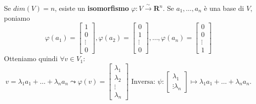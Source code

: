 \begin{definition}
	Se $dim(V)=n$, esiste un \textbf{isomorfismo} $\varphi: V \xrightarrow{\sim} \mathbf{R}^n$. Se $a_1, \hdots, a_n$ è una base di $V$, poniamo
	\begin{equation*}
		\varphi(a_1)=
		\begin{bmatrix}
			1 \\ 0 \\ \vdots \\ 0
		\end{bmatrix},
		\varphi(a_2)=
		\begin{bmatrix}
			0 \\ 1 \\ \vdots \\ 0
		\end{bmatrix},
		\hdots,
		\varphi(a_n)=
		\begin{bmatrix}
			0 \\ 0 \\ \vdots \\ 1
		\end{bmatrix}
	\end{equation*}
	Otteniamo quindi $\forall v \in V_1$:
	\begin{equation*}
		v = \lambda_{1}a_1 + \ldots + \lambda_n a_n \leadsto \varphi(v) = \begin{bmatrix}
			\lambda_{1} \\
			\lambda_{2} \\
			\vdots \\
			\lambda_{n}
		\end{bmatrix}
		\text{ Inversa: } \psi : 
		\begin{bmatrix}
			\lambda_{1} \\
			\vdots
			\lambda_{n}
		\end{bmatrix}
		\mapsto
		\lambda_{1}a_1 + \ldots + \lambda_{n} a_n.
	\end{equation*}
\end{definition}

